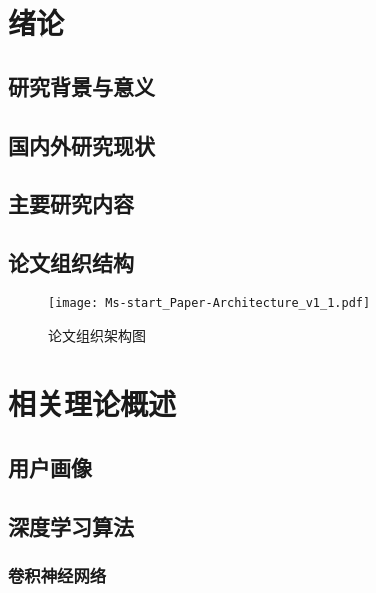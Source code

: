 \section{绪论}
\subsection{研究背景与意义}

\subsection{国内外研究现状}

\subsection{主要研究内容}

\subsection{论文组织结构}

\begin{figure}[hbt]
	\centering
	\texttt{[image: Ms-start\_Paper-Architecture\_v1\_1.pdf]}
	\caption{论文组织架构图}
	\label{Fig:Paper-Architecture}
\end{figure}

\section{相关理论概述}
\subsection{用户画像}

\subsection{深度学习算法}

\subsubsection{卷积神经网络}

